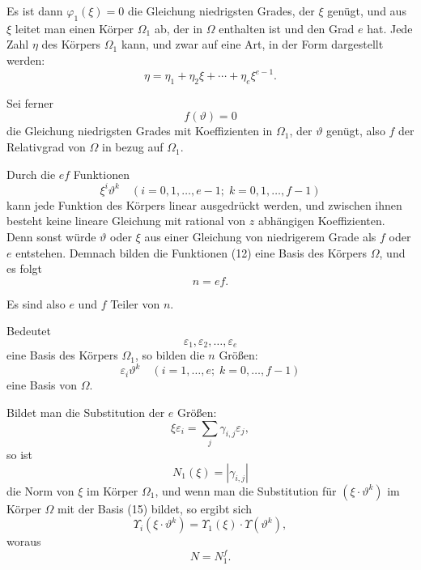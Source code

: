 \documentclass[12pt,a4paper]{article}
\theoremstyle{definition}
\begin{document}
Es ist dann $\varphi_1(\xi) = 0$ die Gleichung niedrigsten Grades, der $\xi$ genügt, und aus $\xi$ leitet man einen Körper $\Omega_1$ ab, der in $\Omega$ enthalten ist und den Grad $e$ hat. Jede Zahl $\eta$ des Körpers $\Omega_1$ kann, und zwar auf eine Art, in der Form dargestellt werden:
\begin{equation}
\eta = \eta_1 + \eta_2\xi + \cdots + \eta_e\xi^{e-1}.
\end{equation}

Sei ferner
\begin{equation}
f(\vartheta) = 0
\end{equation}
die Gleichung niedrigsten Grades mit Koeffizienten in $\Omega_1$, der $\vartheta$ genügt, also $f$ der Relativgrad von $\Omega$ in bezug auf $\Omega_1$.

Durch die $ef$ Funktionen
\begin{equation}
\xi^i \vartheta^k \quad (i = 0, 1, \ldots, e-1; \; k = 0, 1, \ldots, f-1)
\end{equation}
kann jede Funktion des Körpers linear ausgedrückt werden, und zwischen ihnen besteht keine lineare Gleichung mit rational von $z$ abhängigen Koeffizienten. Denn sonst würde $\vartheta$ oder $\xi$ aus einer Gleichung von niedrigerem Grade als $f$ oder $e$ entstehen. Demnach bilden die Funktionen (12) eine Basis des Körpers $\Omega$, und es folgt
\begin{equation}
n = ef.
\end{equation}

Es sind also $e$ und $f$ Teiler von $n$.

Bedeutet
\begin{equation}
\varepsilon_1, \varepsilon_2, \ldots, \varepsilon_e
\end{equation}
eine Basis des Körpers $\Omega_1$, so bilden die $n$ Größen:
\begin{equation}
\varepsilon_i \vartheta^k \quad (i = 1, \ldots, e; \; k = 0, \ldots, f-1)
\end{equation}
eine Basis von $\Omega$.

Bildet man die Substitution der $e$ Größen:
\[\xi\varepsilon_i = \sum_j \gamma_{i,j}\varepsilon_j,\]
so ist
\begin{equation}
N_1(\xi) = |\gamma_{i,j}|
\end{equation}
die Norm von $\xi$ im Körper $\Omega_1$, und wenn man die Substitution für $(\xi \cdot \vartheta^k)$ im Körper $\Omega$ mit der Basis (15) bildet, so ergibt sich
\[\Upsilon_i(\xi \cdot \vartheta^k) = \Upsilon_1(\xi) \cdot \Upsilon(\vartheta^k),\]
woraus
\begin{equation}
N = N_1^f.
\end{equation}
\end{document}
